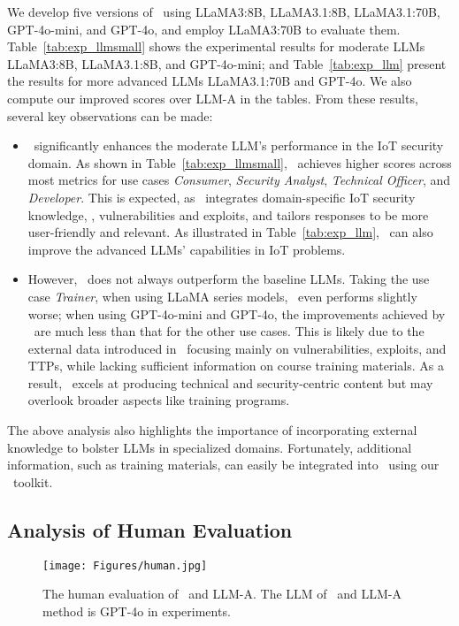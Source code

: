 We develop five versions of \chatiot\ using LLaMA3:8B, LLaMA3.1:8B, LLaMA3.1:70B, GPT-4o-mini, and GPT-4o, and employ LLaMA3:70B to evaluate them.
Table~\ref{tab:exp_llmsmall} shows the experimental results for moderate LLMs LLaMA3:8B, LLaMA3.1:8B, and GPT-4o-mini; and Table~\ref{tab:exp_llm} present the results for more advanced LLMs LLaMA3.1:70B and GPT-4o.
We also compute our improved scores over LLM-A in the tables.
From these results, several key observations can be made: 
\begin{itemize}
\item \chatiot\ significantly enhances the moderate LLM's performance in the IoT security domain. As shown in Table~\ref{tab:exp_llmsmall}, \chatiot\ achieves higher scores across most metrics for use cases \textit{Consumer}, \textit{Security Analyst}, \textit{Technical Officer}, and \textit{Developer}.
This is expected, as \chatiot\ integrates domain-specific IoT security knowledge, \eg, vulnerabilities and exploits, and tailors responses to be more user-friendly and relevant.
As illustrated in Table~\ref{tab:exp_llm}, \chatiot\ can also improve the advanced LLMs' capabilities in IoT problems.

\item However, \chatiot\ does not always outperform the baseline LLMs.
Taking the use case \textit{Trainer}, when using LLaMA series models, \chatiot\ even performs slightly worse; when using GPT-4o-mini and GPT-4o, the improvements achieved by \chatiot\ are much less than that for the other use cases.
This is likely due to the external data introduced in \chatiot\ focusing mainly on vulnerabilities, exploits, and TTPs, while lacking sufficient information on course training materials.
As a result, \chatiot\ excels at producing technical and security-centric content but may overlook broader aspects like training programs.
\end{itemize}

The above analysis also highlights the importance of incorporating external knowledge to bolster LLMs in specialized domains.
Fortunately, additional information, such as training materials, can easily be integrated into \chatiot\ using our \datakit\ toolkit.

\subsection{Analysis of Human Evaluation}\label{sec:exp-human}

\begin{figure}
    \centering
    \texttt{[image: Figures/human.jpg]}
    \caption{The human evaluation of \chatiot\ and LLM-A. The LLM of \chatiot\ and LLM-A method is GPT-4o in experiments.}
    \label{fig:human-exp}
\end{figure}


